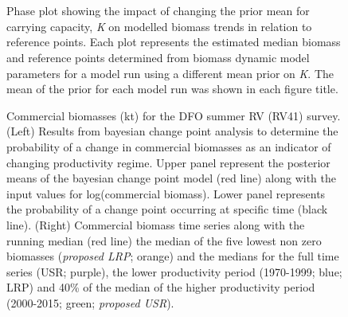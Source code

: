 \documentclass[11pt]{article}
\newcommand{\e}{/backup/bio_data/bio.lobster/figures/} %
\newcommand{\spm}{/backup/bio_data/bio.lobster/spmodelling/lfa41/}
\begin{document}
\begin{landscape}
\begin{figure}
\centering
 \\
 \\



\caption{Phase plot showing the impact of changing the prior mean for carrying capacity, \emph{K} on modelled biomass trends in relation to reference points. Each plot represents the estimated median biomass and reference points determined from biomass dynamic model parameters for a model run using a different mean prior on \emph{K}. The mean of the prior for each model run was shown in each figure title.}

\end{figure}
\end{landscape}
     \clearpage



\begin{landscape}
\begin{figure}
\centering
       \caption{Commercial biomasses (kt) for the DFO summer RV (RV41) survey. (Left) Results from bayesian change point analysis to determine the probability of a change in commercial biomasses as an indicator of changing productivity regime. Upper panel represent the posterior means of the bayesian change point model (red line) along with the input values for log(commercial biomass). Lower panel represents the probability of a change point occurring at specific time (black line). (Right) Commercial biomass time series along with the running median (red line) the median of the five lowest non zero biomasses (\emph{proposed LRP}; orange) and the medians for the full time series (USR; purple), the lower productivity period (1970-1999; blue; LRP) and 40\% of the median of the higher productivity period (2000-2015; green; \emph{proposed USR}). }

\end{figure}
\end{landscape}
\end{document}
